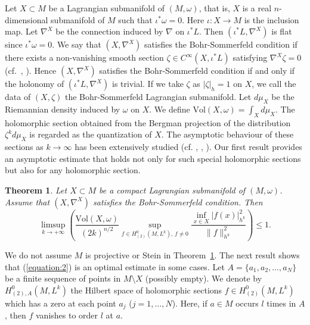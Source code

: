 \documentclass[12pt,oneside]{amsart}
\theoremstyle{plain}
\newtheorem{theorem}{Theorem}
\theoremstyle{definition}
\theoremstyle{remark}
\begin{document}
Let $X \subset M$ be a Lagrangian submanifold of $(M, \omega)$, that is, $X$ is a real $n$-dimensional submanifold of $M$ such that $\iota^{*}\omega = 0$.  
Here $\iota: X \to M$ is the inclusion map.  
Let $\nabla^{X}$ be the connection induced by $\nabla$ on $\iota^{*}L$.  
Then $(\iota^{*}L, \nabla^{X})$ is flat since $\iota^{*}\omega = 0$.  
We say that $(X, \nabla^{X})$ satisfies the Bohr-Sommerfeld condition if there exists a non-vanishing smooth section $\zeta \in C^{\infty}(X, \iota^{*}L)$ satisfying $\nabla^{X} \zeta = 0$ (cf.~\cite{Ioo}, \cite{Ver}).  
Hence $(X, \nabla^{X})$ satisfies the Bohr-Sommerfeld condition if and only if the holonomy of $(\iota^{*}L, \nabla^{X})$ is trivial.  
If we take $\zeta$ as $|\zeta|_{h} = 1$ on $X$, we call the data of $(X, \zeta)$ the Bohr-Sommerfeld Lagrangian submanifold.  
Let $d\mu_{X}$ be the Riemannian density induced by $\omega$ on $X$.  %
We define $\mathrm{Vol}(X, \omega) = \int_{X} d\mu_{X}$. 
The holomorphic section obtained from
the Bergman projection of the distribution $\zeta^k d\mu_{X}$ is regarded as the quantization of $X$.   The asymptotic behaviour of these sections as $k \to \infty$ has been extensively studied (cf. \cite{Bor-Pau-Uri}, \cite{Deb-Pao}, \cite{Ioo}).    
Our first result provides an asymptotic estimate that holds not only for such special holomorphic sections but also for any holomorphic section.
\begin{theorem}\label{theorem:1}
Let $X \subset M$ be a compact Lagrangian submanifold of $(M, \omega)$.  
Assume that $(X, \nabla^{X})$ satisfies the Bohr-Sommerfeld condition.  
Then 
\begin{equation}\label{equation:2}
\limsup_{k \to +\infty}\left(\frac{\mathrm{Vol}(X, \omega)}{(2k)^{n/2}} \sup_{f \in H^{0}_{(2)}(M, L^k), \, f \neq 0} \frac{\inf_{x \in X} |f(x)|^2_{h^k}}{\|f\|^2_{h^k}} \right) \leq 1.  
\end{equation}
\end{theorem}
We do not assume $M$ is projective or Stein in Theorem~\ref{theorem:1}.  
The next result shows that (\ref{equation:2}) is an optimal estimate in some cases.  
Let $A = \{a_1, a_2, \ldots, a_N\}$ be a finite sequence of points in $M \setminus X$ (possibly empty).  
We denote by 
$H^{0}_{(2), A}(M, L^k)$ the Hilbert space of holomorphic sections $f \in H^{0}_{(2)}(M, L^k)$ which has a zero at each point $a_{j}$ ($j = 1, \ldots, N$).  
Here, if $a \in M$ occurs $l$ times in $A$, then $f$ vanishes to order $l$ at $a$.  
\end{document}
